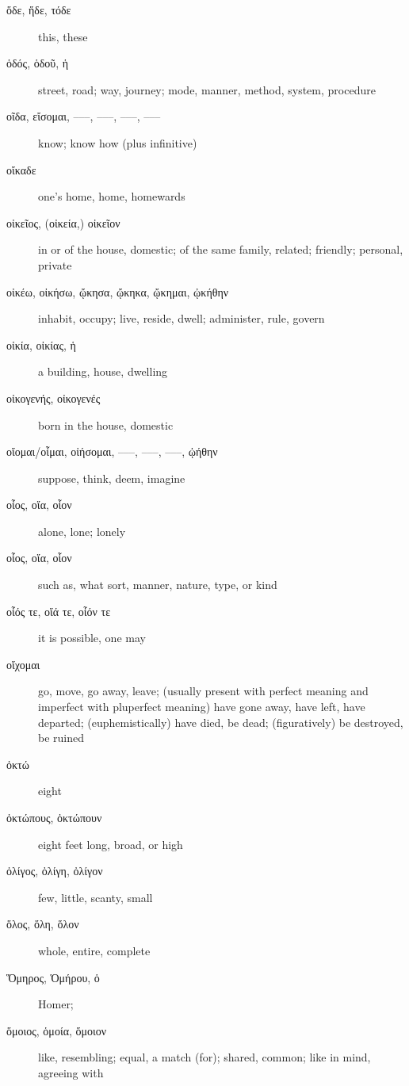 \documentclass[12pt,letterpaper]{article}
\begin{document}
\begin{description}
    \item[\textgreek{ὅδε, ἥδε, τόδε}] \marginnote{*}this, these
    \item[\textgreek{ὁδός, ὁδοῦ, ἡ}] \marginnote{*}street, road; way, journey; mode, manner, method, system, procedure
    \item[\textgreek{οῖδα, εἴσομαι, –––, –––, –––, –––}] \marginnote{*}know; know how (plus infinitive)
    \item[\textgreek{οἴκαδε}] one's home, home, homewards
    \item[\textgreek{οἰκεῖος, (οἰκεία,) οἰκεῖον}] \marginnote{*}in or of the house, domestic; of the same family, related; friendly; personal, private
    \item[\textgreek{οἰκέω, οἰκήσω, ᾤκησα, ᾤκηκα, ᾤκημαι, ᾠκήθην}] \marginnote{*}inhabit, occupy; live, reside, dwell; administer, rule, govern
    \item[\textgreek{οἰκία, οἰκίας, ἡ}] \marginnote{*}a building, house, dwelling
    \item[\textgreek{οἰκογενής, οἰκογενές}] born in the house, domestic
    \item[\textgreek{οἴομαι/οἶμαι, οἰήσομαι, –––, –––, –––, ᾠήθην}] \marginnote{*}suppose, think, deem, imagine
    \item[\textgreek{οἶος, οἴα, οἶον}] alone, lone; lonely
    \item[\textgreek{οἷος, οἵα, οἷον}] \marginnote{*}such as, what sort, manner, nature, type, or kind
    \item[\textgreek{οἷός τε, οἵά τε, οἷόν τε}] \marginnote{*}it is possible, one may
    \item[\textgreek{οἴχομαι}] go, move, go away, leave; (usually present with perfect meaning and imperfect with pluperfect meaning) have gone away, have left, have departed; (euphemistically) have died, be dead; (figuratively) be destroyed, be ruined
    \item[\textgreek{ὀκτώ}] \marginnote{*}eight
    \item[\textgreek{ὀκτώπους, ὀκτώπουν}] eight feet long, broad, or high
    \item[\textgreek{ὀλίγος, ὀλίγη, ὀλίγον}] \marginnote{*}few, little, scanty, small
    \item[\textgreek{ὅλος, ὅλη, ὅλον}] \marginnote{*}whole, entire, complete
    \item[\textgreek{Ὅμηρος, Ὁμήρου, ὁ}] Homer;
    \item[\textgreek{ὅμοιος, ὁμοία, ὅμοιον}] \marginnote{*}like, resembling; equal, a match (for); shared, common; like in mind, agreeing with

\end{description}
\end{document}
